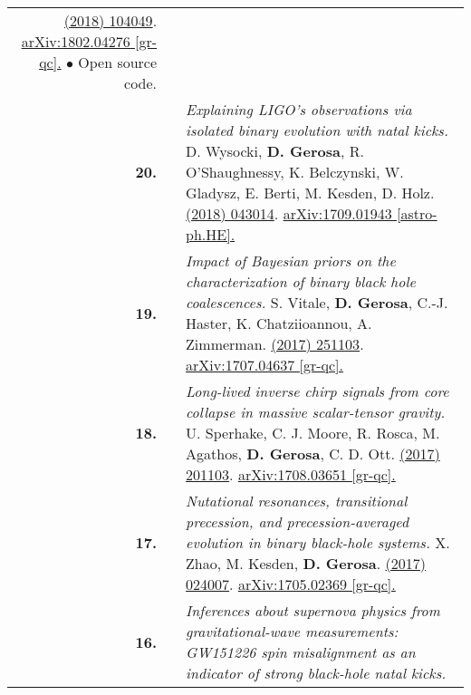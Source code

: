 {\begin{longtable}{rp{0.3cm}p{15.8cm}}
\href{https://journals.aps.org/prd/abstract/10.1103/PhysRevD.97.104049}{\prd 97 (2018) 104049}. \href{https://arxiv.org/abs/1802.04276}{arXiv:1802.04276 [gr-qc].}
\newline{}
\textcolor{color1}{$\bullet$} Open source code.
\vspace{0.09cm}\\
%
\textbf{20.} & & \textit{Explaining LIGO's observations via isolated binary evolution with natal kicks.}
\newline{}
D. Wysocki, \textbf{D. Gerosa}, R. O'Shaughnessy, K. Belczynski, W. Gladysz, E. Berti, M. Kesden, D. Holz.
\newline{}
\href{https://journals.aps.org/prd/abstract/10.1103/PhysRevD.97.043014}{\prd 97 (2018) 043014}. \href{https://arxiv.org/abs/1709.01943}{arXiv:1709.01943 [astro-ph.HE].}
\vspace{0.09cm}\\
%
\textbf{19.} & & \textit{Impact of Bayesian priors on the characterization of binary black hole coalescences.}
\newline{}
S. Vitale, \textbf{D. Gerosa}, C.-J. Haster, K. Chatziioannou, A. Zimmerman.
\newline{}
\href{http://dx.doi.org/10.1103/PhysRevLett.119.251103}{\prl 119 (2017) 251103}. \href{https://arxiv.org/abs/1707.04637}{arXiv:1707.04637 [gr-qc].}
\vspace{0.09cm}\\
%
\textbf{18.} & & \textit{Long-lived inverse chirp signals from core collapse in massive scalar-tensor gravity.}
\newline{}
U. Sperhake, C. J. Moore, R. Rosca, M. Agathos, \textbf{D. Gerosa}, C. D. Ott.
\newline{}
\href{http://dx.doi.org/10.1103/PhysRevLett.119.201103}{\prl 119 (2017) 201103}. \href{https://arxiv.org/abs/1708.03651}{arXiv:1708.03651 [gr-qc].}
\vspace{0.09cm}\\
%
\textbf{17.} & & \textit{Nutational resonances, transitional precession, and precession-averaged evolution in binary black-hole systems.}
\newline{}
X. Zhao, M. Kesden, \textbf{D. Gerosa}.
\newline{}
\href{http://dx.doi.org/10.1103/PhysRevD.96.024007}{\prd 96 (2017) 024007}. \href{https://arxiv.org/abs/1705.02369}{arXiv:1705.02369 [gr-qc].}
\vspace{0.09cm}\\
%
\textbf{16.} & & \textit{Inferences about supernova physics from gravitational-wave measurements: GW151226 spin misalignment as an indicator of strong black-hole natal kicks.}

\end{longtable}}
